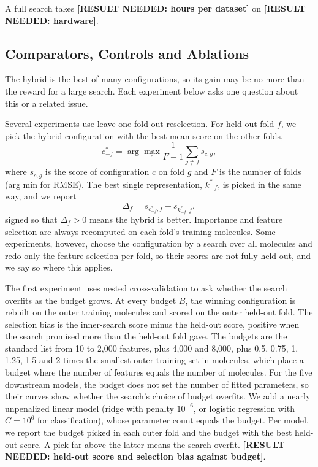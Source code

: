 A full search takes \textbf{[RESULT NEEDED: hours per dataset]} on \textbf{[RESULT NEEDED: hardware]}.


\subsection{Comparators, Controls and Ablations}\label{sec:method:comparators}

The hybrid is the best of many configurations, so its gain may be no more than the reward for a large search. Each experiment below asks one question about this or a related issue.

Several experiments use leave-one-fold-out reselection. For held-out fold $f$, we pick the hybrid configuration with the best mean score on the other folds,
\[
c^*_{-f} = \arg\max_c \frac{1}{F-1}\sum_{g\neq f} s_{c,g},
\]
where $s_{c,g}$ is the score of configuration $c$ on fold $g$ and $F$ is the number of folds (arg min for RMSE). The best single representation, $k^*_{-f}$, is picked in the same way, and we report
\[
\Delta_f = s_{c^*_{-f},f} - s_{k^*_{-f},f},
\]
signed so that $\Delta_f>0$ means the hybrid is better. Importance and feature selection are always recomputed on each fold's training molecules. Some experiments, however, choose the configuration by a search over all molecules and redo only the feature selection per fold, so their scores are not fully held out, and we say so where this applies.

The first experiment uses nested cross-validation to ask whether the search overfits as the budget grows. At every budget $B$, the winning configuration is rebuilt on the outer training molecules and scored on the outer held-out fold. The selection bias is the inner-search score minus the held-out score, positive when the search promised more than the held-out fold gave. The budgets are the standard list from 10 to 2,000 features, plus 4,000 and 8,000, plus 0.5, 0.75, 1, 1.25, 1.5 and 2 times the smallest outer training set in molecules, which place a budget where the number of features equals the number of molecules. For the five downstream models, the budget does not set the number of fitted parameters, so their curves show whether the search's choice of budget overfits. We add a nearly unpenalized linear model (ridge with penalty $10^{-6}$, or logistic regression with $C = 10^{6}$ for classification), whose parameter count equals the budget. Per model, we report the budget picked in each outer fold and the budget with the best held-out score. A pick far above the latter means the search overfit. \textbf{[RESULT NEEDED: held-out score and selection bias against budget]}.

